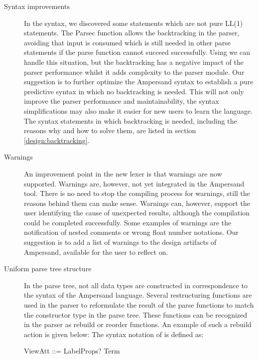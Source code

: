 \begin{description}
  \item[Syntax improvements]
    In the syntax, we discovered some statements which are not pure LL(1) statements.
    The Parsec  function allows the backtracking in the parser, avoiding that input is consumed which is still needed in other parse statements if the parse function cannot succeed successfully.
    Using  we can handle this situation, but the backtracking has a negative impact of the parser performance whilst it adds complexity to the parser module.
    Our suggestion is to further optimize the Ampersand syntax to establish a pure predictive syntax in which no backtracking is needed.
    This will not only improve the parser performance and maintainability, the syntax simplifications may also make it easier for new users to learn the language.
    The syntax statements in which backtracking is needed, including the reasons why and how to solve them, are listed in section \ref{design:backtracking}.

  \item[Warnings]
    An improvement point in the new lexer is that warnings are now supported. 
    Warnings are, however, not yet integrated in the Ampersand tool.
    There is no need to stop the compiling process for warnings, still the reasons behind them can make sense.
    Warnings can, however, support the user identifying the cause of unexpected results, although the compilation could be completed successfully.
	Some examples of warnings are the notification of nested comments or wrong float number notations.
    Our suggestion is to add a list of warnings to the design artifacts of Ampersand, available for the user to reflect on.

  \item[Uniform parse tree structure]
   In the parse tree, not all data types are constructed in correspondence to the syntax of the Ampersand language.
   Several restructuring functions are used in the parser to reformulate the result of the parse functions to match the constructor type in the parse tree.
   These functions can be recognized in the parser as rebuild or reorder functions.
   An example of such a rebuild action is given below:
   The syntax notation of  is defined as:
   \begin{ebnf}
    ViewAtt ::= LabelProps? Term\end{ebnf}
   

\end{description}
